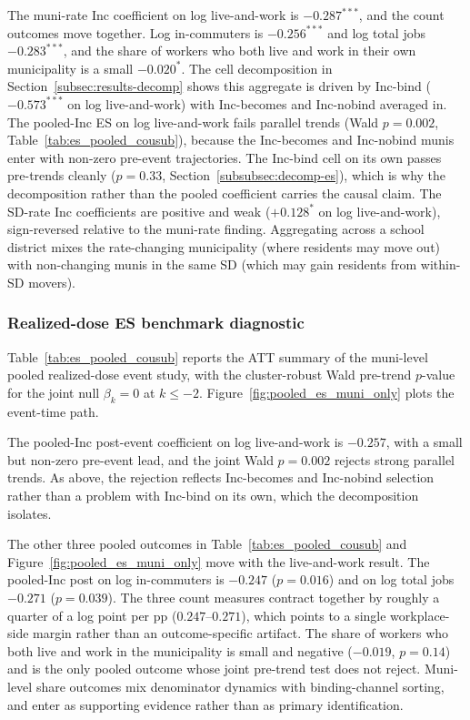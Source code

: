 \documentclass[12pt]{article}
\begin{document}


The muni-rate Inc coefficient on log live-and-work is
$-0.287^{***}$, and the count outcomes move together. Log
in-commuters is $-0.256^{***}$ and log total jobs $-0.283^{***}$,
and the share of workers who both live and work in their own
municipality is a small $-0.020^{*}$. The cell decomposition in
Section~\ref{subsec:results-decomp} shows this aggregate is driven
by Inc-bind ($-0.573^{***}$ on log live-and-work) with Inc-becomes
and Inc-nobind averaged in. The pooled-Inc ES on log live-and-work
fails parallel trends (Wald $p=0.002$, Table~\ref{tab:es_pooled_cousub}),
because the Inc-becomes and Inc-nobind munis enter with non-zero
pre-event trajectories. The Inc-bind cell on its own passes
pre-trends cleanly ($p=0.33$, Section~\ref{subsubsec:decomp-es}),
which is why the decomposition rather than the pooled coefficient
carries the causal claim. The SD-rate Inc coefficients are positive
and weak ($+0.128^{*}$ on log live-and-work), sign-reversed relative
to the muni-rate finding. Aggregating across a school district mixes
the rate-changing municipality (where residents may move out) with
non-changing munis in the same SD (which may gain residents from
within-SD movers).

\subsubsection{Realized-dose ES benchmark diagnostic}
\label{subsubsec:pooled-es}

Table~\ref{tab:es_pooled_cousub} reports the ATT summary of the
muni-level pooled realized-dose event study, with the
cluster-robust Wald pre-trend $p$-value for the joint null
$\beta_k = 0$ at $k \leq -2$.
Figure~\ref{fig:pooled_es_muni_only} plots the event-time path.



The pooled-Inc post-event coefficient on log live-and-work is
$-0.257$, with a small but non-zero pre-event lead, and the joint
Wald $p=0.002$ rejects strong parallel trends. As above, the rejection
reflects Inc-becomes and Inc-nobind selection rather than a problem
with Inc-bind on its own, which the decomposition isolates.

The other three pooled outcomes in Table~\ref{tab:es_pooled_cousub}
and Figure~\ref{fig:pooled_es_muni_only} move with the live-and-work
result. The pooled-Inc post on log in-commuters is $-0.247$
($p=0.016$) and on log total jobs $-0.271$ ($p=0.039$). The three
count measures contract together by roughly a quarter of a log point
per pp ($0.247$--$0.271$), which points to a single workplace-side
margin rather than an outcome-specific artifact. The share of workers
who both live and work in the municipality is small and negative
($-0.019$, $p=0.14$) and is the only pooled outcome whose joint
pre-trend test does not reject. Muni-level share outcomes mix
denominator dynamics with binding-channel sorting, and enter as
supporting evidence rather than as primary identification.
\end{document}
